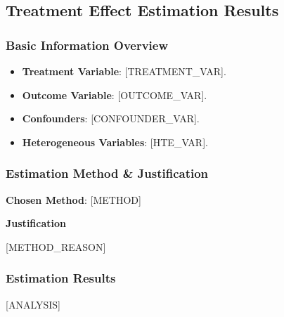\subsection{Treatment Effect Estimation Results}

\subsubsection{Basic Information Overview}
\begin{itemize}
    \item \textbf{Treatment Variable}: [TREATMENT_VAR].
    \item \textbf{Outcome Variable}: [OUTCOME_VAR].
    \item \textbf{Confounders}: [CONFOUNDER_VAR].
    \item \textbf{Heterogeneous Variables}: [HTE_VAR].
\end{itemize}

\subsubsection{Estimation Method \& Justification}

\textbf{Chosen Method}: [METHOD]

\textbf{Justification}

[METHOD_REASON]


\subsubsection{Estimation Results}

[ANALYSIS]


